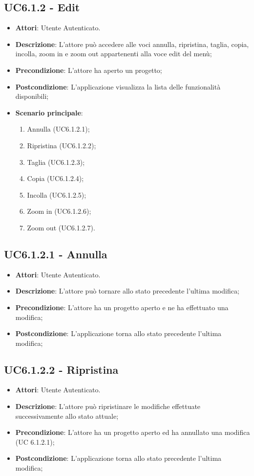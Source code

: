 \subsection{UC6.1.2 - Edit} 
\label{ssec:UC6.1.2} 
\begin{itemize} 
\item \textbf{Attori}: Utente Autenticato.
\item \textbf{Descrizione}: L’attore può accedere alle voci annulla, ripristina, taglia, copia, incolla, zoom in e zoom out appartenenti alla voce edit del menù;
\item \textbf{Precondizione}: L'attore ha aperto un progetto;
\item \textbf{Postcondizione}: L’applicazione visualizza la lista delle funzionalità disponibili;
\item \textbf{Scenario principale}: \begin{enumerate}\item Annulla (UC6.1.2.1);\item Ripristina (UC6.1.2.2);\item Taglia (UC6.1.2.3);\item Copia (UC6.1.2.4);\item Incolla (UC6.1.2.5);\item Zoom in (UC6.1.2.6);\item Zoom out (UC6.1.2.7). 
 \end{enumerate}
\end{itemize} 
\subsection{UC6.1.2.1 - Annulla} 
\label{ssec:UC6.1.2.1} 
\begin{itemize} 
\item \textbf{Attori}: Utente Autenticato.
\item \textbf{Descrizione}: L’attore può tornare allo stato precedente l’ultima modifica;
\item \textbf{Precondizione}: L'attore ha un progetto aperto e ne ha effettuato una modifica;
\item \textbf{Postcondizione}: L’applicazione torna allo stato precedente l’ultima modifica;
\end{itemize} 
\subsection{UC6.1.2.2 - Ripristina} 
\label{ssec:UC6.1.2.2} 
\begin{itemize} 
\item \textbf{Attori}: Utente Autenticato.
\item \textbf{Descrizione}: L’attore può ripristinare le modifiche effettuate successivamente allo stato attuale;
\item \textbf{Precondizione}: L’attore ha un progetto aperto ed ha annullato una modifica (UC 6.1.2.1);
\item \textbf{Postcondizione}: L’applicazione torna allo stato precedente l’ultima modifica;
\end{itemize} 
